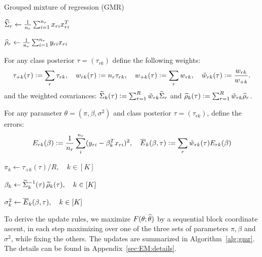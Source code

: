 \documentclass[12pt]{article}
\begin{document}
\begin{algorithm}[t!]
	\caption{Grouped mixture of regression (GMR)}\label{alg:gmr}
	\label{Palgorithm}
	\begin{algorithmic}[1]
		\State {}
		$\widehat{\Sigma}_r \gets \frac1{n_r}\sum_{i=1}^{n_r} x_{ri} x_{ri}^T$
		
		\State {}
		$\widehat\rho_r \gets  \frac1{n_r}\sum_{i=1}^{n_r} y_{ri} x_{ri}$
		
		\State For any class posterior $\tau = (\tau_{rk})$ define the following weights:
		\begin{align*}
		\tau_{+k}(\tau) := \sum_r \tau_{rk}, 
		\quad w_{rk}(\tau) :=  n_r \tau_{rk},
		\quad  w_{+k}(\tau) := \sum_r  w_{rk},
		\quad \check w_{rk}(\tau) :=  \frac{w_{rk}}{w_{+k}}.
		\end{align*}
		and the weighted covariances: $\widetilde{\Sigma}_k(\tau) := \sum_{r=1}^R \check w_{rk} \widehat{\Sigma}_r$ and 
		$\widetilde{\rho}_k(\tau) := \sum_{r=1}^R \check w_{rk}  \widehat\rho_r$.
		
		
		\State For any parameter $\theta = (\pi,\beta,\sigma^2)$ and class posterior $\tau = (\tau_{rk})$, define the errors:
		\begin{align*}
		E_{rk}(\beta) := \frac1{n_r}\sum_{i}^{n_r}   (y_{ri} - \beta_k^T x_{ri})^2, \quad 
		\overline{E}_k(\beta,\tau) := \sum_r \check w_{rk}(\tau) E_{rk}(\beta)
		\end{align*}
		
		\State {}
		$\pi_k \gets \tau_{+k}(\tau)/R, \quad k \in [K] $
		
		\State {}
		$\beta_k \gets \widetilde{\Sigma}_k^{-1}(\tau) \,\widetilde{\rho}_k(\tau),\quad  k \in [K] $
		
		\State {}
		$\sigma^2_k \gets \overline{E}_k(\beta, \tau), \quad k \in [K]$
		
		\EndWhile
	\end{algorithmic}
	
\end{algorithm}

To derive the update rules, we maximize $F(\theta;\widehat\theta)$ by a sequential block coordinate ascent, in each step maximizing  over one of the three sets of parameters $\pi, \beta$ and $\sigma^2$, while fixing the others. The updates are summarized in Algorithm~\ref{alg:gmr}. The details can be found in Appendix~\ref{sec:EM:details}.
\end{document}
